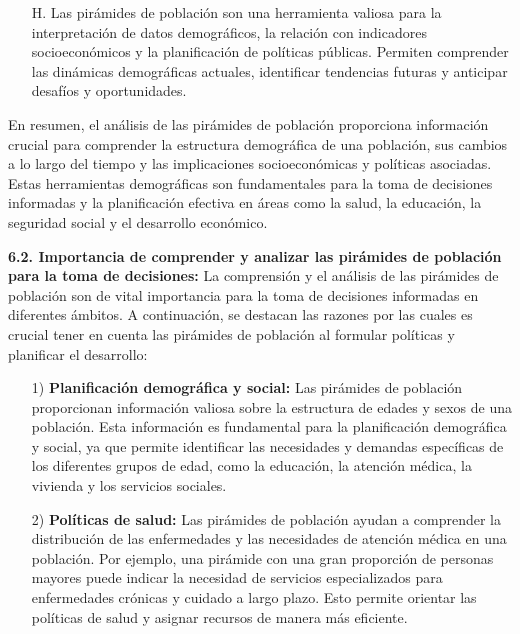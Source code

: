 \documentclass[8pt,a4paper]{beamer}
\begin{document}
{\begin{frame}{}
\begin{block}{}
\begin{enumerate}
\end{enumerate}
\end{block}
\end{frame}

\begin{frame}{}
\begin{block}{}
\justifying

\begin{enumerate}
\justifying

\item[H.] Las pirámides de población son una herramienta valiosa para la interpretación de datos demográficos, la relación con indicadores socioeconómicos y la planificación de políticas públicas. Permiten comprender las dinámicas demográficas actuales, identificar tendencias futuras y anticipar desafíos y oportunidades.
\end{enumerate}
En resumen, el análisis de las pirámides de población proporciona información crucial para comprender la estructura demográfica de una población, sus cambios a lo largo del tiempo y las implicaciones socioeconómicas y políticas asociadas. Estas herramientas demográficas son fundamentales para la toma de decisiones informadas y la planificación efectiva en áreas como la salud, la educación, la seguridad social y el desarrollo económico.
\end{block}
\end{frame}

\begin{frame}{}
\begin{block}{\textbf{6.2. Importancia de comprender y analizar las pirámides de población para la toma de decisiones:}}
\justifying
La comprensión y el análisis de las pirámides de población son de vital importancia para la toma de decisiones informadas en diferentes ámbitos. A continuación, se destacan las razones por las cuales es crucial tener en cuenta las pirámides de población al formular políticas y planificar el desarrollo:
\begin{enumerate}
\justifying
\item[1)] \textbf{Planificación demográfica y social:} Las pirámides de población proporcionan información valiosa sobre la estructura de edades y sexos de una población. Esta información es fundamental para la planificación demográfica y social, ya que permite identificar las necesidades y demandas específicas de los diferentes grupos de edad, como la educación, la atención médica, la vivienda y los servicios sociales.

\item[2)] \textbf{Políticas de salud:} Las pirámides de población ayudan a comprender la distribución de las enfermedades y las necesidades de atención médica en una población. Por ejemplo, una pirámide con una gran proporción de personas mayores puede indicar la necesidad de servicios especializados para enfermedades crónicas y cuidado a largo plazo. Esto permite orientar las políticas de salud y asignar recursos de manera más eficiente.
\end{enumerate}
\end{block}
\end{frame}

}
\end{document}
